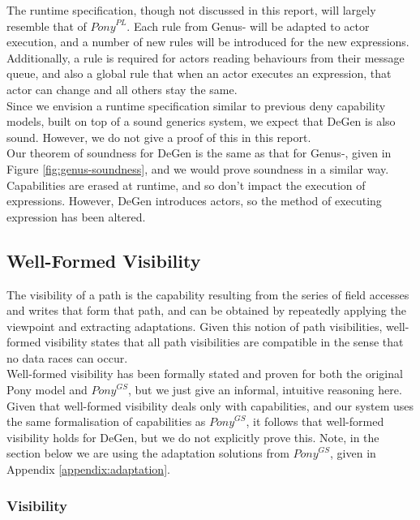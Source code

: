 The runtime specification, though not discussed in this report, will largely resemble that of $\textit{Pony}^{PL}$. Each rule from Genus- will be adapted to actor execution, and a number of new rules will be introduced for the new expressions. Additionally, a rule is required for actors reading behaviours from their message queue, and also a global rule that when an actor executes an expression, that actor can change and all others stay the same. \\

Since we envision a runtime specification similar to previous deny capability models, built on top of a sound generics system, we expect that DeGen is also sound. However, we do not give a proof of this in this report. \\

Our theorem of soundness for DeGen is the same as that for Genus-, given in Figure \ref{fig:genus-soundness}, and we would prove soundness in a similar way. Capabilities are erased at runtime, and so don't impact the execution of expressions. However, DeGen introduces actors, so the method of executing expression has been altered. \\


\subsection{Well-Formed Visibility}

The visibility of a path is the capability resulting from the series of field accesses and writes that form that path, and can be obtained by repeatedly applying the viewpoint and extracting adaptations. Given this notion of path visibilities, well-formed visibility states that all path visibilities are compatible in the sense that no data races can occur. \\

Well-formed visibility has been formally stated and proven for both the original Pony model and $\textit{Pony}^{GS}$, but we just give an informal, intuitive reasoning here. Given that well-formed visibility deals only with capabilities, and our system uses the same formalisation of capabilities as $\textit{Pony}^{GS}$, it follows that well-formed visibility holds for DeGen, but we do not explicitly prove this. Note, in the section below we are using the adaptation solutions from $\textit{Pony}^{GS}$, given in Appendix \ref{appendix:adaptation}.

\subsubsection{Visibility}

